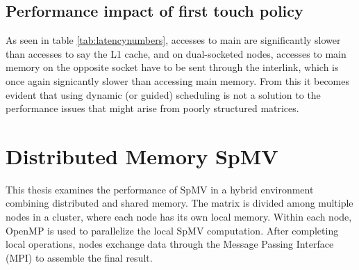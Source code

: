 \subsection{Performance impact of first touch policy}
As seen in table \ref{tab:latencynumbers}, accesses to main are significantly slower than accesses to say the L1 cache, and on dual-socketed nodes, accesses to main memory on the opposite socket have to be sent through the interlink, which is once again signicantly slower than accessing main memory. From this it becomes evident that using dynamic (or guided) scheduling is not a solution to the performance issues that might arise from poorly structured matrices.













\section{Distributed Memory SpMV}
This thesis examines the performance of SpMV in a hybrid environment combining distributed and shared memory. The matrix is divided among multiple nodes in a cluster, where each node has its own local memory. Within each node, OpenMP is used to parallelize the local SpMV computation. After completing local operations, nodes exchange data through the Message Passing Interface (MPI) to assemble the final result. 

